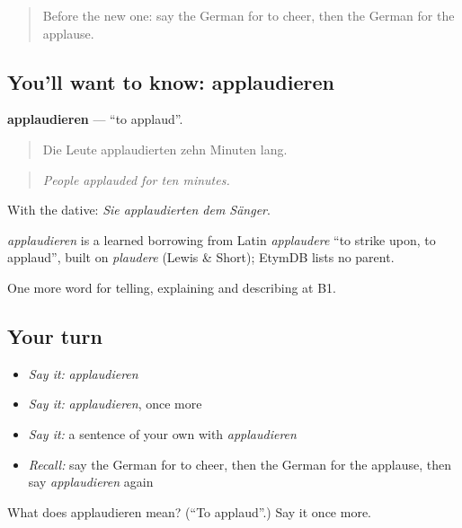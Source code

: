\label{lesson:GE-C308-applaudieren}



\begin{quote}
Before the new one: say the German for to cheer, then the German for the applause.
\end{quote}

\subsection*{You'll want to know: applaudieren}
\textbf{applaudieren} — \textquotedblleft{}to applaud\textquotedblright{}.

\begin{quote}
Die Leute applaudierten zehn Minuten lang.
\end{quote}

\begin{quote}
\emph{People applauded for ten minutes.}
\end{quote}

With the dative: \emph{Sie applaudierten dem Sänger}.

\begin{cousinweb}
\emph{applaudieren} is a learned borrowing from Latin \emph{applaudere} \textquotedblleft{}to strike upon, to applaud\textquotedblright{}, built on \emph{plaudere} (Lewis \& Short); EtymDB lists no parent.
\end{cousinweb}

\begin{grammarlens}[title={What you've built}]
One more word for telling, explaining and describing at B1.
\end{grammarlens}

\subsection*{Your turn}
\begin{itemize}
\raggedright
  \item \emph{Say it:} \emph{applaudieren}
  \item \emph{Say it:} \emph{applaudieren}, once more
  \item \emph{Say it:} a sentence of your own with \emph{applaudieren}
  \item \emph{Recall:} say the German for to cheer, then the German for the applause, then say \emph{applaudieren} again
\end{itemize}

\begin{tcolorbox}[breakable,colback=teal!4,colframe=teal!35!black,title={Before you move on}]
What does applaudieren mean? (\textquotedblleft{}To applaud\textquotedblright{}.) Say it once more.
\end{tcolorbox}
